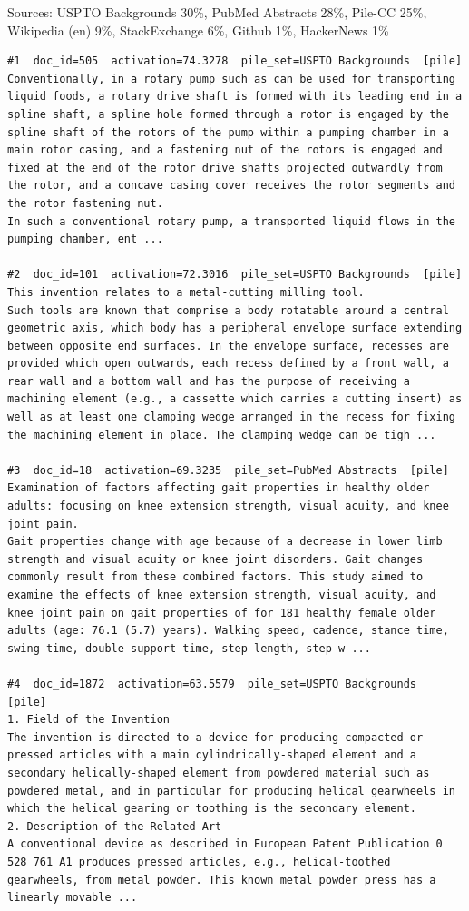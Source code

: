 Sources: USPTO Backgrounds 30\%, PubMed Abstracts 28\%, Pile-CC 25\%, Wikipedia (en) 9\%, StackExchange 6\%, Github 1\%, HackerNews 1\%

\begin{verbatim}
#1  doc_id=505  activation=74.3278  pile_set=USPTO Backgrounds  [pile]
Conventionally, in a rotary pump such as can be used for transporting liquid foods, a rotary drive shaft is formed with its leading end in a spline shaft, a spline hole formed through a rotor is engaged by the spline shaft of the rotors of the pump within a pumping chamber in a main rotor casing, and a fastening nut of the rotors is engaged and fixed at the end of the rotor drive shafts projected outwardly from the rotor, and a concave casing cover receives the rotor segments and the rotor fastening nut.
In such a conventional rotary pump, a transported liquid flows in the pumping chamber, ent ...

#2  doc_id=101  activation=72.3016  pile_set=USPTO Backgrounds  [pile]
This invention relates to a metal-cutting milling tool.
Such tools are known that comprise a body rotatable around a central geometric axis, which body has a peripheral envelope surface extending between opposite end surfaces. In the envelope surface, recesses are provided which open outwards, each recess defined by a front wall, a rear wall and a bottom wall and has the purpose of receiving a machining element (e.g., a cassette which carries a cutting insert) as well as at least one clamping wedge arranged in the recess for fixing the machining element in place. The clamping wedge can be tigh ...

#3  doc_id=18  activation=69.3235  pile_set=PubMed Abstracts  [pile]
Examination of factors affecting gait properties in healthy older adults: focusing on knee extension strength, visual acuity, and knee joint pain.
Gait properties change with age because of a decrease in lower limb strength and visual acuity or knee joint disorders. Gait changes commonly result from these combined factors. This study aimed to examine the effects of knee extension strength, visual acuity, and knee joint pain on gait properties of for 181 healthy female older adults (age: 76.1 (5.7) years). Walking speed, cadence, stance time, swing time, double support time, step length, step w ...

#4  doc_id=1872  activation=63.5579  pile_set=USPTO Backgrounds  [pile]
1. Field of the Invention
The invention is directed to a device for producing compacted or pressed articles with a main cylindrically-shaped element and a secondary helically-shaped element from powdered material such as powdered metal, and in particular for producing helical gearwheels in which the helical gearing or toothing is the secondary element.
2. Description of the Related Art
A conventional device as described in European Patent Publication 0 528 761 A1 produces pressed articles, e.g., helical-toothed gearwheels, from metal powder. This known metal powder press has a linearly movable ...


\end{verbatim}
